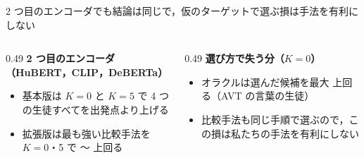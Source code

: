 \begin{frame}{2 つ目のエンコーダでも結論は同じで，仮のターゲットで選ぶ損は手法を有利にしない}
  \vspace{0.3em}
  \begin{columns}[T,onlytextwidth]
    \begin{column}{0.49\textwidth}
      \textbf{\footnotesize 2 つ目のエンコーダ（HuBERT，CLIP，DeBERTa）}\par\vspace{0.2em}
      \begin{itemize}\scriptsize\setlength{\itemsep}{7pt}
        \item 基本版は $K=0$ と $K=5$ で 4 つの生徒すべてを出発点より上げる
        \item 拡張版は最も強い比較手法を $K=0$・5 で 〜 \pt 上回る
      \end{itemize}
    \end{column}
    \begin{column}{0.49\textwidth}
      \textbf{\footnotesize 選び方で失う分（$K=0$）}\par\vspace{0.2em}
      \begin{itemize}\scriptsize\setlength{\itemsep}{7pt}
        \item オラクルは選んだ候補を最大  \pt 上回る（AVT の言葉の生徒）
        \item 比較手法も同じ手順で選ぶので，この損は私たちの手法を有利にしない
      \end{itemize}
    \end{column}
  \end{columns}
  \vspace{0.6em}
\end{frame}
